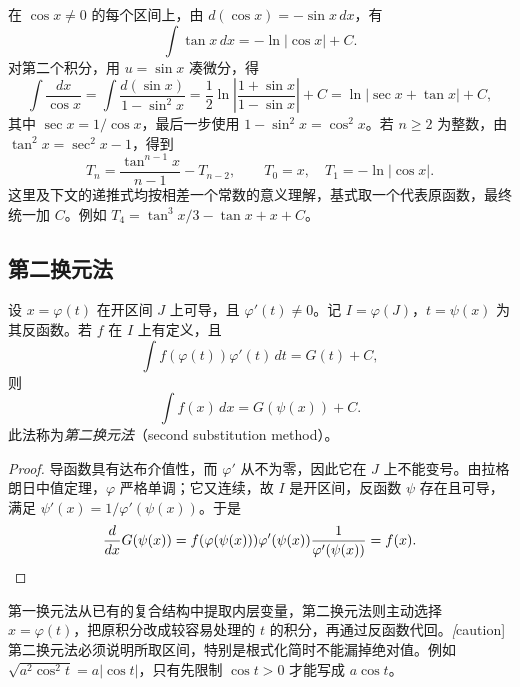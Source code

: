\documentclass[UTF8,12pt,a4paper,fontset=fandol]{ctexbook}
\begin{document}
\begin{solve}
在 $\cos x\neq0$ 的每个区间上，由 $d(\cos x)=-\sin x\,dx$，有
\[
    \int\tan x\,dx=-\ln|\cos x|+C.
\]
对第二个积分，用 $u=\sin x$ 凑微分，得
\[
    \int\frac{dx}{\cos x}
       =\int\frac{d(\sin x)}{1-\sin^2x}
       =\frac12\ln\left|\frac{1+\sin x}{1-\sin x}\right|+C
       =\ln|\sec x+\tan x|+C,
\]
其中 $\sec x=1/\cos x$，最后一步使用 $1-\sin^2x=\cos^2x$。若 $n\geq2$ 为整数，由 $\tan^2x=\sec^2x-1$，得到
\begin{equation}
    T_n=\frac{\tan^{n-1}x}{n-1}-T_{n-2},
    \qquad T_0=x,\quad T_1=-\ln|\cos x|.
    \label{eq:tangent-power-integral-recurrence}
\end{equation}
这里及下文的递推式均按相差一个常数的意义理解，基式取一个代表原函数，最终统一加 $C$。例如 $T_4=\tan^3x/3-\tan x+x+C$。
\end{solve}

\subsection{第二换元法}
\label{subsec:second-substitution-method}

\begin{theorem}[第二换元积分法]
\label{thm:second-substitution-indefinite-integral}
设 $x=\varphi(t)$ 在开区间 $J$ 上可导，且 $\varphi'(t)\neq0$。记 $I=\varphi(J)$，$t=\psi(x)$ 为其反函数。若 $f$ 在 $I$ 上有定义，且
\[
    \int f(\varphi(t))\varphi'(t)\,dt=G(t)+C,
\]
则
\begin{equation}
    \int f(x)\,dx=G(\psi(x))+C.
    \label{eq:second-substitution-indefinite-integral}
\end{equation}
此法称为\emph{第二换元法}（second substitution method）。
\end{theorem}

\begin{proof}
导函数具有达布介值性，而 $\varphi'$ 从不为零，因此它在 $J$ 上不能变号。由拉格朗日中值定理，$\varphi$ 严格单调；它又连续，故 $I$ 是开区间，反函数 $\psi$ 存在且可导，满足 $\psi'(x)=1/\varphi'(\psi(x))$。于是
\[
    \frac{d}{dx}G(\psi(x))
       =f(\varphi(\psi(x)))\varphi'(\psi(x))
          \frac1{\varphi'(\psi(x))}=f(x).
    \qedhere
\]
\end{proof}

第一换元法从已有的复合结构中提取内层变量，第二换元法则主动选择 $x=\varphi(t)$，把原积分改成较容易处理的 $t$ 的积分，再通过反函数代回。\emph[caution]{第二换元法必须说明所取区间，特别是根式化简时不能漏掉绝对值。}例如 $\sqrt{a^2\cos^2t}=a|\cos t|$，只有先限制 $\cos t>0$ 才能写成 $a\cos t$。
\end{document}
